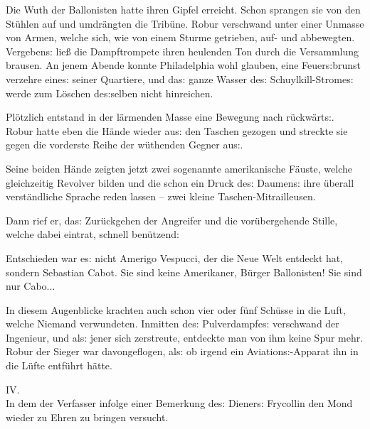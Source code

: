 \documentclass[oneside,12pt]{book}
\newenvironment{antiqua}{\normalfont}{}
\newcommand{\s}{s:}
\begin{document}
Die Wuth der Ballonisten hatte ihren Gipfel erreicht. Schon sprangen
sie von den St\"uhlen auf und umdr\"angten die Trib\"une. Robur
verschwand unter einer Unmasse von Armen, welche sich, wie von einem
Sturme getrieben, auf- und abbewegten. Vergeben{\s} lie{\ss} die
Dampftrompete ihren heulenden Ton durch die Versammlung brausen. An
jenem Abende konnte Philadelphia wohl glauben, eine Feuer{\s}brunst
verzehre eine{\s} seiner Quartiere, und da{\s} ganze Wasser de{\s}
Schuylkill-Strome{\s} werde zum L\"oschen de{\s}selben nicht
hinreichen.

Pl\"otzlich entstand in der l\"armenden Masse eine Bewegung nach
r\"uck\-w\"art{\s}. Robur hatte eben die H\"ande wieder au{\s} den
Taschen gezogen und streckte sie gegen die vorderste Reihe der
w\"uthenden Gegner au{\s}.

Seine beiden H\"ande zeigten jetzt zwei sogenannte amerikanische
F\"auste, welche gleichzeitig Revolver bilden und die schon ein Druck
de{\s} Daumen{\s} ihre \"uberall verst\"andliche Sprache reden lassen
-- zwei kleine Taschen-Mitrailleusen.

Dann rief er, da{\s} Zur\"uckgehen der Angreifer und die
vor\"ubergehende Stille, welche dabei eintrat, schnell ben\"utzend:

{\glqq}Entschieden war e{\s} nicht Amerigo Vespucci, der die Neue
Welt entdeckt hat, sondern Sebastian Cabot. Sie sind keine
Amerikaner, B\"urger Ballonisten! Sie sind nur Cabo...{\grqq}

In diesem Augenblicke krachten auch schon vier oder f\"unf Sch\"usse
in die Luft, welche Niemand verwundeten. Inmitten de{\s}
Pulverdampfe{\s} verschwand der Ingenieur, und al{\s} jener sich
zerstreute, entdeckte man von ihm keine Spur mehr. Robur der Sieger
war davongeflogen, al{\s} ob irgend ein Aviation{\s}-Apparat ihn in
die L\"ufte entf\"uhrt h\"atte.



\newpage\begin{center}\label{kap04}
{\large \begin{antiqua}IV.\end{antiqua}\\\medskip
In dem der Verfasser infolge einer Bemerkung de{\s} Diener{\s}
Frycollin den Mond wieder zu Ehren zu bringen versucht.\\\bigskip}
\end{center}
\end{document}
